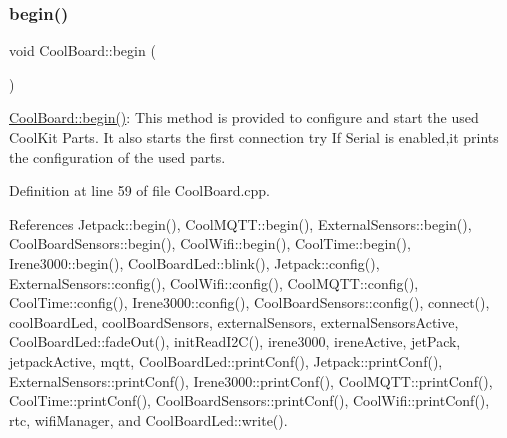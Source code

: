 \subsubsection{\texorpdfstring{begin()}{begin()}}
{\footnotesize\ttfamily void Cool\+Board\+::begin (\begin{DoxyParamCaption}{ }\end{DoxyParamCaption})}

\hyperlink{classCoolBoard_acba7c5aef7268b2c0044bdb54d3b9d76}{Cool\+Board\+::begin()}\+: This method is provided to configure and start the used Cool\+Kit Parts. It also starts the first connection try If Serial is enabled,it prints the configuration of the used parts. 

Definition at line 59 of file Cool\+Board.\+cpp.



References Jetpack\+::begin(), Cool\+M\+Q\+T\+T\+::begin(), External\+Sensors\+::begin(), Cool\+Board\+Sensors\+::begin(), Cool\+Wifi\+::begin(), Cool\+Time\+::begin(), Irene3000\+::begin(), Cool\+Board\+Led\+::blink(), Jetpack\+::config(), External\+Sensors\+::config(), Cool\+Wifi\+::config(), Cool\+M\+Q\+T\+T\+::config(), Cool\+Time\+::config(), Irene3000\+::config(), Cool\+Board\+Sensors\+::config(), connect(), cool\+Board\+Led, cool\+Board\+Sensors, external\+Sensors, external\+Sensors\+Active, Cool\+Board\+Led\+::fade\+Out(), init\+Read\+I2\+C(), irene3000, irene\+Active, jet\+Pack, jetpack\+Active, mqtt, Cool\+Board\+Led\+::print\+Conf(), Jetpack\+::print\+Conf(), External\+Sensors\+::print\+Conf(), Irene3000\+::print\+Conf(), Cool\+M\+Q\+T\+T\+::print\+Conf(), Cool\+Time\+::print\+Conf(), Cool\+Board\+Sensors\+::print\+Conf(), Cool\+Wifi\+::print\+Conf(), rtc, wifi\+Manager, and Cool\+Board\+Led\+::write().


